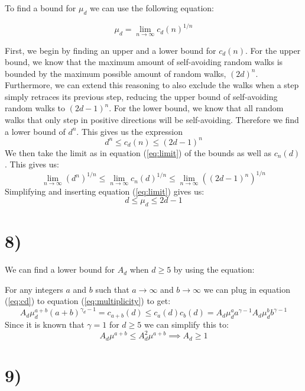 \documentclass[a4paper]{article}
\begin{document}
To find a bound for $\mu_d$ we can use the following equation:

\begin{equation}
    \label{eq:limit}
     \mu_d = \lim_{n \to \infty} c_d(n)^{1/n}
\end{equation}


First, we begin by finding an upper and a lower bound for $c_d(n)$. For the upper bound, we know that the maximum amount of self-avoiding random walks is bounded by the maximum possible amount of random walks, $(2d)^n$. Furthermore, we can extend this reasoning to also exclude the walks when a step simply retraces its previous step, reducing the upper bound of self-avoiding random walks to $(2d-1)^n$. For the lower bound, we know that all random walks that only step in positive directions will be self-avoiding. Therefore we find a lower bound of $d^n$. This gives us the expression \begin{equation}
    d^n \leq c_d(n) \leq (2d-1)^n
\end{equation}
We then take the limit as in equation (\ref{eq:limit}) of the bounds as well as $c_n(d)$. This gives us:
\begin{equation}
    \lim_{n \to \infty} (d^n)^{1/n} \leq \lim_{n \to \infty} c_n(d)^{1/n} \leq \lim_{n \to \infty} ((2d-1)^n)^{1/n}
\end{equation}
Simplifying and inserting equation (\ref{eq:limit}) gives us:
\begin{equation}
    d \leq \mu_d \leq 2d-1
\end{equation}

\section*{8)}
We can find a lower bound for $A_d$ when $d \geq 5$ by using the equation:


For any integers $a$ and $b$ such that $a \to \infty$ and $b \to \infty$ we can plug in equation (\ref{eq:cd}) to equation (\ref{eq:multiplicity}) to get:
\begin{equation}
    A_d\mu_d^{a+b}(a+b)^{\gamma_d-1} = c_{a+b}(d)\leq c_a(d)c_b(d) = A_d\mu_d^aa^{\gamma-1}A_d\mu_d^bb^{\gamma-1}
\end{equation}
Since it is known that $\gamma = 1$ for $d \geq 5$ we can simplify this to:
\begin{equation}
    A_d\mu^{a+b} \leq A_d^2\mu^{a+b} \implies A_d \geq 1
\end{equation}
\section*{9)}
\end{document}

